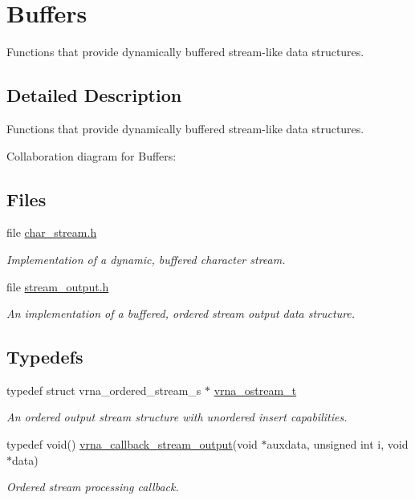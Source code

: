 \hypertarget{group__buffer__utils}{}\section{Buffers}
\label{group__buffer__utils}


Functions that provide dynamically buffered stream-\/like data structures.  




\subsection{Detailed Description}
Functions that provide dynamically buffered stream-\/like data structures. 

Collaboration diagram for Buffers\+:
\subsection*{Files}
\begin{DoxyCompactItemize}
\item 
file \mbox{\hyperlink{datastructures_2char__stream_8h}{char\+\_\+stream.\+h}}
\begin{DoxyCompactList}\small\item\em Implementation of a dynamic, buffered character stream. \end{DoxyCompactList}\item 
file \mbox{\hyperlink{datastructures_2stream__output_8h}{stream\+\_\+output.\+h}}
\begin{DoxyCompactList}\small\item\em An implementation of a buffered, ordered stream output data structure. \end{DoxyCompactList}\end{DoxyCompactItemize}
\subsection*{Typedefs}
\begin{DoxyCompactItemize}
\item 
\mbox{\label{group__buffer__utils_ga8da189552af21ab6e4e88bdcc240870c}} 
typedef struct vrna\+\_\+ordered\+\_\+stream\+\_\+s $\ast$ \mbox{\hyperlink{group__buffer__utils_ga8da189552af21ab6e4e88bdcc240870c}{vrna\+\_\+ostream\+\_\+t}}
\begin{DoxyCompactList}\small\item\em An ordered output stream structure with unordered insert capabilities. \end{DoxyCompactList}\item 
typedef void() \mbox{\hyperlink{group__buffer__utils_ga4adb94338a6f0a1a451e03c1bdac0d9d}{vrna\+\_\+callback\+\_\+stream\+\_\+output}}(void $\ast$auxdata, unsigned int i, void $\ast$data)
\begin{DoxyCompactList}\small\item\em Ordered stream processing callback. \end{DoxyCompactList}\end{DoxyCompactItemize}

